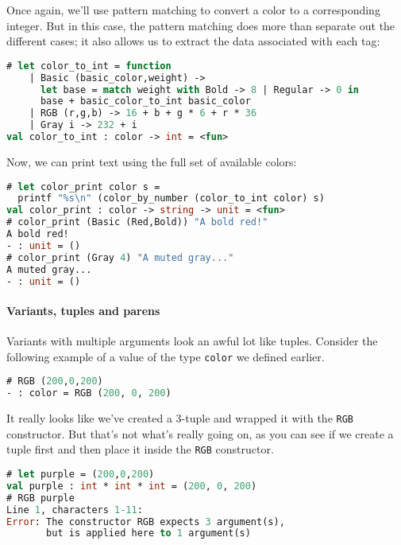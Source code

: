 Once again, we'll use pattern matching to convert a color to a
corresponding integer. But in this case, the pattern matching does more
than separate out the different cases; it also allows us to extract the
data associated with each tag:

\begin{lstlisting}[language=Caml]
# let color_to_int = function
    | Basic (basic_color,weight) ->
      let base = match weight with Bold -> 8 | Regular -> 0 in
      base + basic_color_to_int basic_color
    | RGB (r,g,b) -> 16 + b + g * 6 + r * 36
    | Gray i -> 232 + i
val color_to_int : color -> int = <fun>
\end{lstlisting}

Now, we can print text using the full set of available colors:

\begin{lstlisting}[language=Caml]
# let color_print color s =
  printf "%s\n" (color_by_number (color_to_int color) s)
val color_print : color -> string -> unit = <fun>
# color_print (Basic (Red,Bold)) "A bold red!"
A bold red!
- : unit = ()
# color_print (Gray 4) "A muted gray..."
A muted gray...
- : unit = ()
\end{lstlisting}

\hypertarget{variants-tuples-and-parens}{%
\paragraph{Variants, tuples and
parens}\label{variants-tuples-and-parens}}

Variants with multiple arguments look an awful lot like tuples. Consider
the following example of a value of the type
\passthrough{\lstinline!color!} we defined earlier.

\begin{lstlisting}[language=Caml]
# RGB (200,0,200)
- : color = RGB (200, 0, 200)
\end{lstlisting}

It really looks like we've created a 3-tuple and wrapped it with the
\passthrough{\lstinline!RGB!} constructor. But that's not what's really
going on, as you can see if we create a tuple first and then place it
inside the \passthrough{\lstinline!RGB!} constructor.

\begin{lstlisting}[language=Caml]
# let purple = (200,0,200)
val purple : int * int * int = (200, 0, 200)
# RGB purple
Line 1, characters 1-11:
Error: The constructor RGB expects 3 argument(s),
       but is applied here to 1 argument(s)
\end{lstlisting}

